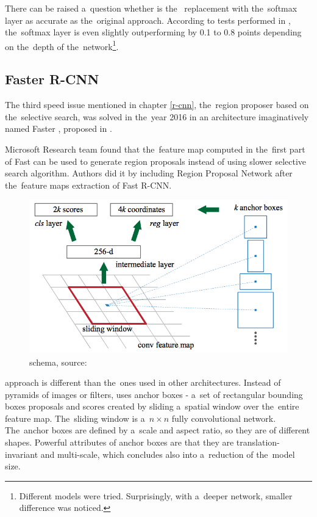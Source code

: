 There can be raised a~question whether is the~ replacement with
the~softmax layer as accurate as the~original approach. According to tests performed 
in \cite{fast-rcnn}, the~softmax layer is even slightly outperforming  
by 0.1 to 0.8  points depending on the~depth of
the~network\footnote{Different models were tried. Surprisingly, with a~deeper network, 
smaller  difference was noticed.}.

\subsection{Faster R-CNN}
\label{faster-rcnn}

The third speed issue mentioned in chapter \ref{r-cnn}, the~region proposer 
based on the~selective search, was solved in the~year 2016 in an architecture 
imaginatively named Faster , proposed in \cite{faster-rcnn}.

Microsoft Research team found that the~feature map computed in the~first part of 
Fast  can be used to generate region proposals instead of using slower 
selective search algorithm. Authors did it by including Region Proposal 
Network  after the~feature maps extraction of Fast R-CNN.

\begin{figure}[H]
   \centering
	\includegraphics[width=.5\linewidth]{./pictures/fasterrcnn-anchors.png}
	\caption[Region proposal network]{ schema, source: \cite{faster-rcnn}}
      \label{fig:rpn}
\end{figure}

 approach is different than the~ones used in other architectures. 
Instead of pyramids of images or filters,  uses anchor boxes - a~set of 
rectangular bounding boxes proposals and scores created by sliding a~spatial 
window over the~entire feature map. The~sliding window is a~$n \times n$ fully 
convolutional network. The~anchor boxes are defined by a~scale and aspect ratio, 
so they are of different shapes. Powerful attributes of anchor boxes are that 
they are translation-invariant and multi-scale, which concludes also into
a~reduction of the~model size.

